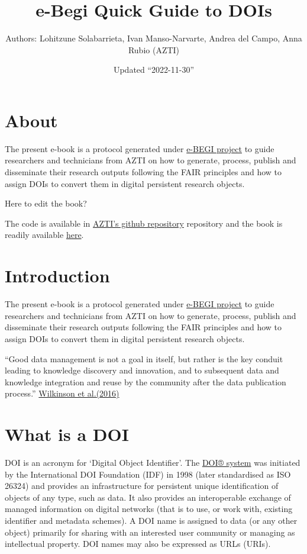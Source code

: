 \documentclass[
]{book}
\title{e-Begi Quick Guide to DOIs}
\author{Authors: Lohitzune Solabarrieta, Ivan Manso-Narvarte, Andrea del Campo, Anna Rubio (AZTI)}
\date{Updated ``2022-11-30''}
\begin{document}
\maketitle

{
\setcounter{tocdepth}{1}
\tableofcontents
}
\hypertarget{about}{%
\chapter*{About}\label{about}}

The present e-book is a protocol generated under \href{https://www.azti.es/proyectos/ebegi/}{e-BEGI project} to guide researchers and technicians from AZTI on how to generate, process, publish and disseminate their research outputs following the FAIR principles and how to assign DOIs to convert them in digital persistent research objects.

Here to edit the book?

The code is available in \href{https://github.com/Fundacion-AZTI/ebegi_quickguide2DOIs}{AZTI's github repository} repository and the book is readily available \href{https://fundacion-azti.github.io/ebegi_quickguide2DOIs/}{here}.

\hypertarget{introduction}{%
\chapter{Introduction}\label{introduction}}

The present e-book is a protocol generated under \href{https://www.azti.es/proyectos/ebegi/}{e-BEGI project} to guide researchers and technicians from AZTI on how to generate, process, publish and disseminate their research outputs following the FAIR principles and how to assign DOIs to convert them in digital persistent research objects.

``Good data management is not a goal in itself, but rather is the key conduit leading to knowledge discovery and innovation, and to subsequent data and knowledge integration and reuse by the community after the data publication process.'' \href{https://www.nature.com/articles/sdata201618}{Wilkinson et al.(2016)}

\hypertarget{what-is-a-doi}{%
\chapter{What is a DOI}\label{what-is-a-doi}}

DOI is an acronym for `Digital Object Identifier'. The \href{https://www.doi.org/}{DOI® system} was initiated by the International DOI Foundation (IDF) in 1998 (later standardised as ISO 26324) and provides an infrastructure for persistent unique identification of objects of any type, such as data. It also provides an interoperable exchange of managed information on digital networks (that is to use, or work with, existing identifier and metadata schemes). A DOI name is assigned to data (or any other object) primarily for sharing with an interested user community or managing as intellectual property. DOI names may also be expressed as URLs (URIs).
\end{document}
